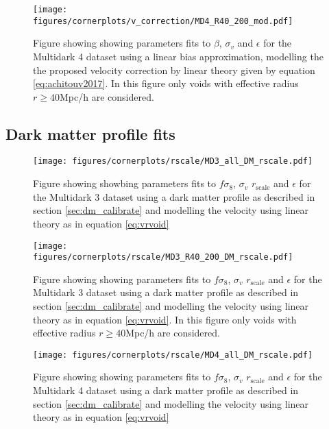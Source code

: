 \begin{figure}[htbp]\label{fig:linbiasMD4modR40}
    \texttt{[image: figures/cornerplots/v\_correction/MD4\_R40\_200\_mod.pdf]}
    \caption{Figure showing showing parameters fits to $\beta$, $\sigma_v$ and $\epsilon$ for the Multidark 4 dataset using a linear bias approximation, modelling the the proposed velocity correction by \cite{Achitouv_streaming} linear theory given by equation \ref{eq:achitouv2017}. In this figure only voids with effective radius $r \geq 40$Mpc/h are considered.}
\end{figure}

\subsection{Dark matter profile fits}

\begin{figure}[htbp]\label{fig:linbiasMD3DM}
    \texttt{[image: figures/cornerplots/rscale/MD3\_all\_DM\_rscale.pdf]}
    \caption{Figure showing showbing parameters fits to $f\sigma_8$, $\sigma_v$ $r_{\mathrm{scale}}$ and $\epsilon$ for the Multidark 3 dataset using a dark matter profile as described in section \ref{sec:dm_calibrate} and modelling the velocity using linear theory as in equation \ref{eq:vrvoid}}
\end{figure}

\begin{figure}[htbp]\label{fig:linbiasMD3DMR40}
    \texttt{[image: figures/cornerplots/rscale/MD3\_R40\_200\_DM\_rscale.pdf]}
    \caption{Figure showing showing parameters fits to $f\sigma_8$, $\sigma_v$ $r_{\mathrm{scale}}$ and $\epsilon$ for the Multidark 3 dataset using a dark matter profile as described in section \ref{sec:dm_calibrate} and modelling the velocity using linear theory as in equation \ref{eq:vrvoid}. In this figure only voids with effective radius $r \geq 40$Mpc/h are considered.}
\end{figure}

\begin{figure}[htbp]\label{fig:linbiasMD4DM}
    \texttt{[image: figures/cornerplots/rscale/MD4\_all\_DM\_rscale.pdf]}
    \caption{Figure showing showing parameters fits to $f\sigma_8$, $\sigma_v$ $r_{\mathrm{scale}}$ and $\epsilon$ for the Multidark 4 dataset using a dark matter profile as described in section \ref{sec:dm_calibrate} and modelling the velocity using linear theory as in equation \ref{eq:vrvoid}}
\end{figure}

